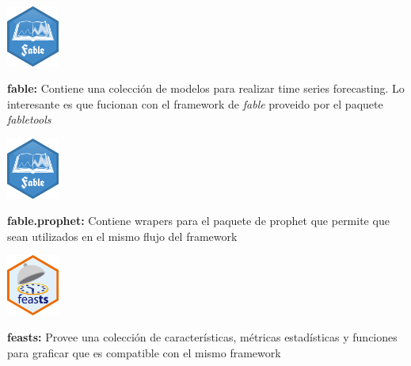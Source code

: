 \begin{minipage}{0.1\textwidth}
\hspace{\fill} 
\end{minipage}
\begin{minipage}{0.3\textwidth}
\includegraphics[height=2cm]{imgs/fable.png}
\end{minipage}
\begin{minipage}{0.5\textwidth}
\textbf{fable:}  Contiene una colección de modelos para realizar time series forecasting. Lo interesante es que fucionan con el framework de \textit{fable} proveido por el paquete \textit{fabletools}
\end{minipage}

\begin{minipage}{0.1\textwidth}
\hspace{\fill} 
\end{minipage}
\begin{minipage}{0.3\textwidth}
\includegraphics[height=2cm]{imgs/fable.png}
\end{minipage}
\begin{minipage}{0.5\textwidth}
\textbf{fable.prophet:}  Contiene wrapers para el paquete de prophet que permite que sean utilizados en el mismo flujo del framework
\end{minipage}

\begin{minipage}{0.1\textwidth}
\hspace{\fill} 
\end{minipage}
\begin{minipage}{0.3\textwidth}
\includegraphics[height=2cm]{imgs/feasts.png}
\end{minipage}
\begin{minipage}{0.5\textwidth}
\textbf{feasts:}  Provee una colección de características, métricas estadísticas y funciones para graficar que es compatible con el mismo framework
\end{minipage}


